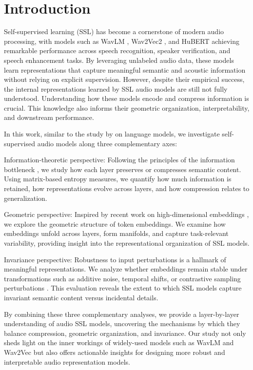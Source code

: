 \documentclass[5p]{elsarticle}
\begin{document}
\section{Introduction}
Self-supervised learning (SSL) has become a cornerstone of modern audio processing, with models such as WavLM \citep{chen2022wavlm}, Wav2Vec2 \cite{baevski2020wav2vec}, and HuBERT \citep{hsu2021hubert} achieving remarkable performance across speech recognition, speaker verification, and speech enhancement tasks. By leveraging unlabeled audio data, these models learn representations that capture meaningful semantic and acoustic information without relying on explicit supervision. However, despite their empirical success, the internal representations learned by SSL audio models are still not fully understood. Understanding how these models encode and compress information is crucial. This knowledge also informs their geometric organization, interpretability, and downstream performance.

In this work, similar to the study by \cite{skean2025layer} on language models, we investigate self-supervised audio models along three complementary axes:

Information-theoretic perspective: Following the principles of the information bottleneck \citep{shwartz2017opening}, we study how each layer preserves or compresses semantic content. Using matrix-based entropy measures, we quantify how much information is retained, how representations evolve across layers, and how compression relates to generalization.

Geometric perspective: Inspired by recent work on high-dimensional embeddings \citep{hosseini2023large}, we explore the geometric structure of token embeddings. We examine how embeddings unfold across layers, form manifolds, and capture task-relevant variability, providing insight into the representational organization of SSL models.

Invariance perspective: Robustness to input perturbations is a hallmark of meaningful representations. We analyze whether embeddings remain stable under transformations such as additive noise, temporal shifts, or contrastive sampling perturbations \citep{oord2018representation, thilak2023lidar, skean2023dime}. This evaluation reveals the extent to which SSL models capture invariant semantic content versus incidental details.

By combining these three complementary analyses, we provide a layer-by-layer understanding of audio SSL models, uncovering the mechanisms by which they balance compression, geometric organization, and invariance. Our study not only sheds light on the inner workings of widely-used models such as WavLM and Wav2Vec but also offers actionable insights for designing more robust and interpretable audio representation models.
\end{document}
